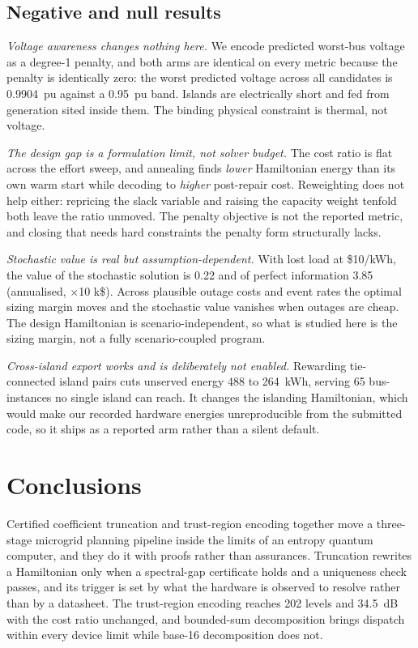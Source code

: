 \documentclass[11pt,twocolumn]{article}
\begin{document}
\subsection{Negative and null results}
{\em Voltage awareness changes nothing here.} We encode predicted worst-bus voltage as a degree-1 penalty, and both arms are identical on every metric because the penalty is identically zero: the worst predicted voltage across all candidates is 0.9904~pu against a 0.95~pu band. Islands are electrically short and fed from generation sited inside them. The binding physical constraint is thermal, not voltage.

{\em The design gap is a formulation limit, not solver budget.} The cost ratio is flat across the effort sweep, and annealing finds {\em lower} Hamiltonian energy than its own warm start while decoding to {\em higher} post-repair cost. Reweighting does not help either: repricing the slack variable and raising the capacity weight tenfold both leave the ratio unmoved. The penalty objective is not the reported metric, and closing that needs hard constraints the penalty form structurally lacks.

{\em Stochastic value is real but assumption-dependent.} With lost load at \$10/kWh, the value of the stochastic solution is 0.22 and of perfect information 3.85 (annualised, $\times$10 k\$). Across plausible outage costs and event rates the optimal sizing margin moves and the stochastic value vanishes when outages are cheap. The design Hamiltonian is scenario-independent, so what is studied here is the sizing margin, not a fully scenario-coupled program.

{\em Cross-island export works and is deliberately not enabled.} Rewarding tie-connected island pairs cuts unserved energy 488 to 264~kWh, serving 65 bus-instances no single island can reach. It changes the islanding Hamiltonian, which would make our recorded hardware energies unreproducible from the submitted code, so it ships as a reported arm rather than a silent default.

\section{Conclusions}
Certified coefficient truncation and trust-region encoding together move a three-stage microgrid planning pipeline inside the limits of an entropy quantum computer, and they do it with proofs rather than assurances. Truncation rewrites a Hamiltonian only when a spectral-gap certificate holds and a uniqueness check passes, and its trigger is set by what the hardware is observed to resolve rather than by a datasheet. The trust-region encoding reaches 202 levels and 34.5~dB with the cost ratio unchanged, and bounded-sum decomposition brings dispatch within every device limit while base-16 decomposition does not.
\end{document}
